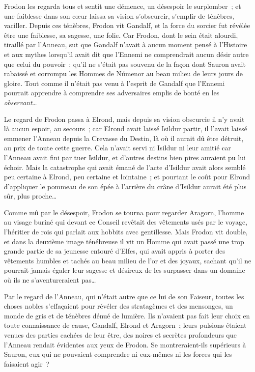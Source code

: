 Frodon les regarda tous et sentit une démence, un désespoir le surplomber~; et une faiblesse dans son cœur laissa sa vision s'obscurcir, s'emplir de ténèbres, vaciller.
Depuis ces ténèbres, Frodon vit Gandalf, et la force du sorcier fut révélée être une faiblesse, sa sagesse, une folie.
Car Frodon, dont le sein était alourdi, tiraillé par l'Anneau, sut que Gandalf n'avait à aucun moment pensé à l'Histoire et aux mythes lorsqu'il avait dit que l'Ennemi ne comprendrait aucun désir autre que celui du pouvoir~; qu'il ne s'était pas souvenu de la façon dont Sauron avait rabaissé et corrompu les Hommes de Númenor au beau milieu de leurs jours de gloire.
Tout comme il n'était pas venu à l'esprit de Gandalf que l'Ennemi pourrait apprendre à comprendre ses adversaires emplis de bonté en les \emph{observant}…

Le regard de Frodon passa à Elrond, mais depuis sa vision obscurcie il n'y avait là aucun espoir, au secours~; car Elrond avait laissé Isildur partir, il l'avait laissé emmener l'Anneau depuis la Crevasse du Destin, là où il aurait dû être détruit, au prix de toute cette guerre.
Cela n'avait servi ni Isildur ni leur amitié car l'Anneau avait fini par tuer Isildur, et d'autres destins bien pires auraient pu lui échoir.
Mais la catastrophe qui avait émané de l'acte d'Isildur avait alors semblé peu certaine à Elrond, peu certaine et lointaine~; et pourtant le coût pour Elrond d'appliquer le pommeau de son épée à l'arrière du crâne d'Isildur aurait été plus sûr, plus proche…

Comme mû par le désespoir, Frodon se tourna pour regarder Aragorn, l'homme au visage buriné qui devant ce Conseil revêtait des vêtements usés par le voyage, l'héritier de rois qui parlait aux hobbits avec gentillesse.
Mais Frodon vit double, et dans la deuxième image ténébreuse il vit un Homme qui avait passé une trop grande partie de sa jeunesse entouré d'Elfes, qui avait appris à porter des vêtements humbles et tachés au beau milieu de l'or et des joyaux, sachant qu'il ne pourrait jamais égaler leur sagesse et désireux de les surpasser dans un domaine où ils ne s'aventureraient pas…

Par le regard de l'Anneau, qui n'était autre que ce lui de son Faiseur, toutes les choses nobles s'effaçaient pour révéler des stratagèmes et des mensonges, un monde de gris et de ténèbres dénué de lumière.
Ils n'avaient pas fait leur choix en toute connaissance de cause, Gandalf, Elrond et Aragorn~; leurs pulsions étaient venues des parties cachées de leur être, des noires et secrètes profondeurs que l'Anneau rendait évidentes aux yeux de Frodon.
Se montreraient-ils supérieurs à Sauron, eux qui ne pouvaient comprendre ni eux-mêmes ni les forces qui les faisaient agir~?

